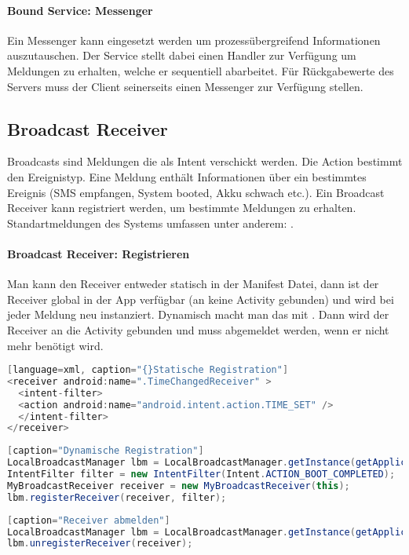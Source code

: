 \paragraph{Bound Service: Messenger} Ein Messenger kann eingesetzt werden um prozessübergreifend Informationen auszutauschen. Der Service stellt dabei einen Handler zur Verfügung um Meldungen zu erhalten, welche er sequentiell abarbeitet. Für Rückgabewerte des Servers muss der Client seinerseits einen Messenger zur Verfügung stellen.
\subsection{Broadcast Receiver} Broadcasts sind Meldungen die als Intent verschickt werden. Die Action bestimmt den Ereignistyp. Eine Meldung enthält Informationen über ein bestimmtes Ereignis (SMS empfangen, System booted, Akku schwach etc.). Ein Broadcast Receiver kann registriert werden, um bestimmte Meldungen zu erhalten. Standartmeldungen des Systems umfassen unter anderem: .
\paragraph{Broadcast Receiver: Registrieren} Man kann den Receiver entweder statisch in der Manifest Datei, dann ist der Receiver global in der App verfügbar (an keine Activity gebunden) und wird bei jeder Meldung neu instanziert. Dynamisch macht man das mit . Dann wird der Receiver an die Activity gebunden und muss abgemeldet werden, wenn er nicht mehr benötigt wird.
\begin{lstlisting}[language=java][language=xml, caption="{}Statische Registration"]
<receiver android:name=".TimeChangedReceiver" >
  <intent-filter>
  <action android:name="android.intent.action.TIME_SET" />
  </intent-filter>
</receiver>
\end{lstlisting}
\begin{lstlisting}[language=java][caption="Dynamische Registration"]
LocalBroadcastManager lbm = LocalBroadcastManager.getInstance(getApplicationContext());
IntentFilter filter = new IntentFilter(Intent.ACTION_BOOT_COMPLETED);
MyBroadcastReceiver receiver = new MyBroadcastReceiver(this);
lbm.registerReceiver(receiver, filter);
\end{lstlisting}
\begin{lstlisting}[language=java][caption="Receiver abmelden"]
LocalBroadcastManager lbm = LocalBroadcastManager.getInstance(getApplicationContext());
lbm.unregisterReceiver(receiver);
\end{lstlisting}
